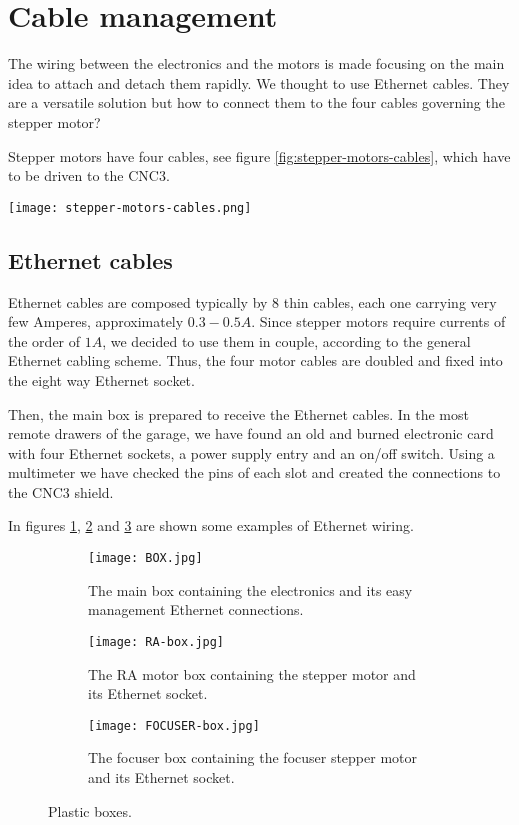 \section{Cable management}
\label{sec:cable-menagement}
The wiring between the electronics and the motors is made focusing on the main idea to attach and detach them rapidly.
We thought to use Ethernet cables.
They are a versatile solution but how to connect them to the four cables governing the stepper motor?

Stepper motors have four cables, see figure \ref{fig:stepper-motors-cables}, which have to be driven to the CNC3.
\\
\begin{minipage}
    {0.5\textwidth}
    \centering
    \texttt{[image: stepper-motors-cables.png]}
    \label{fig:stepper-motors-cables}
\end{minipage}

\subsection{Ethernet cables}
Ethernet cables are composed typically by 8 thin cables, each one carrying very few Amperes, approximately \(0.3-0.5A\).
Since stepper motors require currents of the order of \(1A\), we decided to use them in couple, according to the general Ethernet cabling scheme.
Thus, the four motor cables are doubled and fixed into the eight way Ethernet socket.

Then, the main box is prepared to receive the Ethernet cables.
In the most remote drawers of the garage, we have found an old and burned electronic card with four Ethernet sockets, a power supply entry and an on/off switch.
Using a multimeter we have checked the pins of each slot and created the connections to the CNC3 shield.

In figures \ref{fig:box}, \ref{fig:RA-box} and \ref{fig:focuser-box} are shown some examples of Ethernet wiring.

\begin{figure*}
    \centering
    \begin{subfigure}[t!]
        {0.3\textwidth}
        \centering
        \texttt{[image: BOX.jpg]}
        \caption{The main box containing the electronics and its easy management Ethernet connections.}
        \label{fig:box}
    \end{subfigure}
    \begin{subfigure}[t!]
        {0.3\textwidth}
        \centering
        \texttt{[image: RA-box.jpg]}
        \caption{The RA motor box containing the stepper motor and its Ethernet socket.}
        \label{fig:RA-box}
    \end{subfigure}
    \begin{subfigure}[t!]
        {0.3\textwidth}
        \centering
        \texttt{[image: FOCUSER-box.jpg]}
        \caption{The focuser box containing the focuser stepper motor and its Ethernet socket.}
        \label{fig:focuser-box}
    \end{subfigure}
    \caption{Plastic boxes.}
    \label{fig:plastic-boxes}
\end{figure*}

